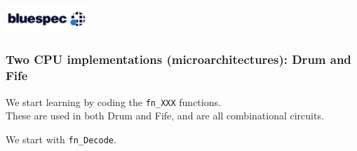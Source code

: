 



\date{L4: {\BSV}: Combinational Circuits}





\begin{frame}
 \titlepage

 \begin{center}
  \includegraphics[height=1cm]{../Figures/Bluespec_Logo_2022-10}
 \end{center}

\end{frame}





\begin{frame}
\frametitle{Two CPU implementations (microarchitectures): Drum and Fife}

\begin{center}
\end{center}

\footnotesize

We start learning {\BSV} by coding the {\tt fn\_XXX} functions.  \\
These are used in both Drum and Fife, and are all combinational circuits.

\vspace*{1ex}

We start with {\tt fn\_Decode}.

\end{frame}

